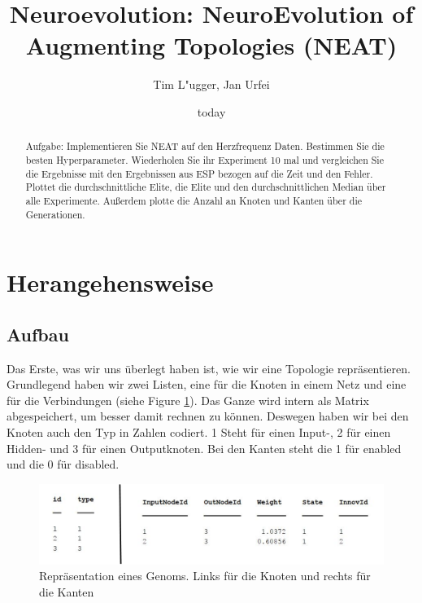\documentclass{hbrs-ecta-report}
\begin{document}

\title{Neuroevolution: NeuroEvolution of Augmenting Topologies (NEAT)}
\subtitle{}

\author{
\alignauthor
Tim L"ugger, Jan Urfei
}

\date{today}
\maketitle
\begin{abstract}
Aufgabe: Implementieren Sie NEAT auf den Herzfrequenz Daten. Bestimmen Sie die besten Hyperparameter. Wiederholen Sie ihr Experiment 10 mal und vergleichen Sie die Ergebnisse mit den Ergebnissen aus ESP bezogen auf die Zeit und den Fehler.
Plottet die durchschnittliche Elite, die Elite und den durchschnittlichen Median über alle Experimente.
Außerdem plotte die Anzahl an Knoten und Kanten über die Generationen.
\end{abstract}

\section{Herangehensweise}
\subsection{Aufbau}
 Das Erste, was wir uns überlegt haben ist, wie wir eine Topologie repräsentieren. Grundlegend haben wir zwei Listen, eine für die Knoten in einem Netz und eine für die Verbindungen (siehe Figure \ref{fig:Genomtabelle}). Das Ganze wird intern als Matrix abgespeichert, um besser damit rechnen zu können. Deswegen haben wir bei den Knoten auch den Typ in Zahlen codiert. 1 Steht für einen Input-, 2 für einen Hidden- und 3 für einen Outputknoten. Bei den Kanten steht die 1 für enabled und die 0 für disabled.
 \begin{figure}[h!]
 	\includegraphics[width=\linewidth]{img/Genomtabelle}
 	\caption{Repräsentation eines Genoms. Links für die Knoten und rechts für die Kanten}
 	\label{fig:Genomtabelle}
 \end{figure}
\end{document}
